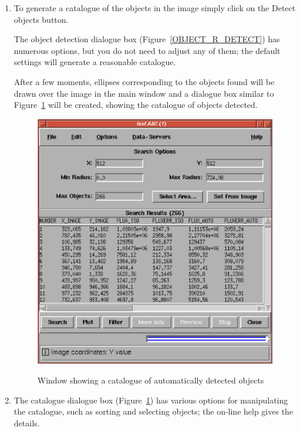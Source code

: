 \documentclass[twoside,11pt]{article}
\begin{document}
\begin{enumerate}
  \item To generate a catalogue of the objects in the image simply
   click on the {\sf Detect objects} button.

   The object detection dialogue box (Figure~\ref{OBJECT_R_DETECT}) has
   numerous options, but you do not need to adjust any of them; the
   default settings will generate a reasonable catalogue.

   After a few moments, ellipses corresponding to the objects found will
   be drawn over the image in the main window and a dialogue box similar
   to Figure~\ref{OBJECT_R_CAT} will be created, showing the catalogue of
   objects detected.

  \begin{figure}[htbp]
     \centering
     \includegraphics[totalheight=3.75in]{sc17_object_r_cat.ps}
     \begin{quote}
     \caption{Window showing a catalogue of automatically detected objects
     \label{OBJECT_R_CAT} }
     \end{quote}
  \end{figure}

  \item The catalogue dialogue box (Figure~\ref{OBJECT_R_CAT}) has various
   options for manipulating the catalogue, such as sorting and selecting
   objects; the on-line help gives the details.


\end{enumerate}
\end{document}
